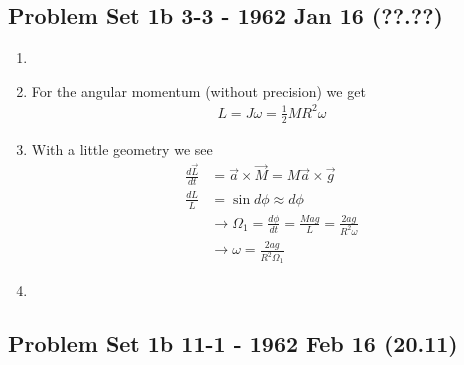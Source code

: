 \documentclass[10pt,a4paper]{book}
\theoremstyle{definition}
\begin{document}
\subsection{Problem Set 1b 3-3 - 1962 Jan 16 (??.??)}
\begin{enumerate}
    \item 
    \item For the angular momentum (without precision) we get
    \begin{align}
        L=J\omega=\frac{1}{2}MR^2\omega
    \end{align}
    \item With a little geometry we see
    \begin{align}
        \frac{d\vec{L}}{dt}&=\vec{a}\times\vec{M}=M\vec{a}\times\vec{g}\\
        \frac{dL}{L}&=\sin d\phi\approx d\phi\\
        &\rightarrow\Omega_1=\frac{d\phi}{dt}=\frac{Mag}{L}=\frac{2ag}{R^2\omega}\\
        &\rightarrow\omega=\frac{2ag}{R^2\Omega_1}
    \end{align}
    \item
\end{enumerate}

\subsection{Problem Set 1b 11-1 - 1962 Feb 16 (20.11)}
\end{document}
